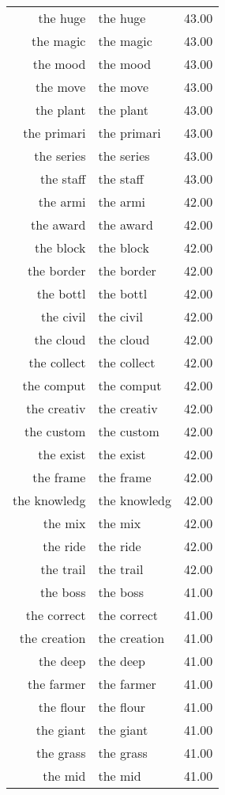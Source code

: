 \begin{table}[ht]
\begin{tabular}{rlr}
  the huge & the huge & 43.00 \\ 
  the magic & the magic & 43.00 \\ 
  the mood & the mood & 43.00 \\ 
  the move & the move & 43.00 \\ 
  the plant & the plant & 43.00 \\ 
  the primari & the primari & 43.00 \\ 
  the series & the series & 43.00 \\ 
  the staff & the staff & 43.00 \\ 
  the armi & the armi & 42.00 \\ 
  the award & the award & 42.00 \\ 
  the block & the block & 42.00 \\ 
  the border & the border & 42.00 \\ 
  the bottl & the bottl & 42.00 \\ 
  the civil & the civil & 42.00 \\ 
  the cloud & the cloud & 42.00 \\ 
  the collect & the collect & 42.00 \\ 
  the comput & the comput & 42.00 \\ 
  the creativ & the creativ & 42.00 \\ 
  the custom & the custom & 42.00 \\ 
  the exist & the exist & 42.00 \\ 
  the frame & the frame & 42.00 \\ 
  the knowledg & the knowledg & 42.00 \\ 
  the mix & the mix & 42.00 \\ 
  the ride & the ride & 42.00 \\ 
  the trail & the trail & 42.00 \\ 
  the boss & the boss & 41.00 \\ 
  the correct & the correct & 41.00 \\ 
  the creation & the creation & 41.00 \\ 
  the deep & the deep & 41.00 \\ 
  the farmer & the farmer & 41.00 \\ 
  the flour & the flour & 41.00 \\ 
  the giant & the giant & 41.00 \\ 
  the grass & the grass & 41.00 \\ 
  the mid & the mid & 41.00 \\ 

\end{tabular}
\end{table}
